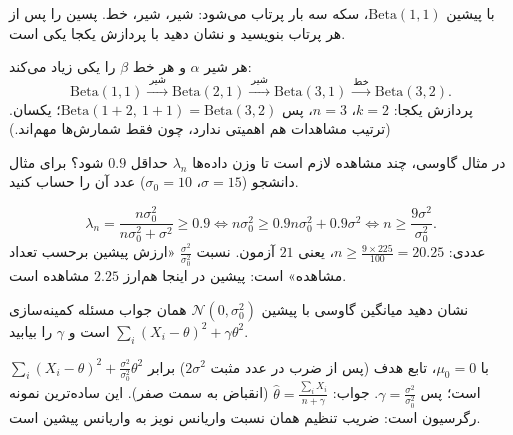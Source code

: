 \begin{exercise}
با پیشین $\mathrm{Beta}(1,1)$، سکه سه بار پرتاب می‌شود: شیر، شیر، خط. پسین را پس از هر پرتاب بنویسید و نشان دهید با پردازش یکجا یکی است.
\end{exercise}
\begin{solution}
هر شیر $\alpha$ و هر خط $\beta$ را یکی زیاد می‌کند:
\[
\mathrm{Beta}(1,1)\xrightarrow{\ \text{شیر}\ }\mathrm{Beta}(2,1)\xrightarrow{\ \text{شیر}\ }\mathrm{Beta}(3,1)\xrightarrow{\ \text{خط}\ }\mathrm{Beta}(3,2).
\]
پردازش یکجا: $k=2$، $n=3$، پس $\mathrm{Beta}(1+2,\ 1+1)=\mathrm{Beta}(3,2)$؛ یکسان. (ترتیب مشاهدات هم اهمیتی ندارد، چون فقط شمارش‌ها مهم‌اند.)
\end{solution}

\begin{exercise}
در مثال گاوسی، چند مشاهده لازم است تا وزن داده‌ها $\lambda_n$ حداقل $0.9$ شود؟ برای مثال دانشجو ($\sigma=15$، $\sigma_0=10$) عدد آن را حساب کنید.
\end{exercise}
\begin{solution}
\[
\lambda_n=\frac{n\sigma_0^2}{n\sigma_0^2+\sigma^2}\ge0.9\iff n\sigma_0^2\ge0.9n\sigma_0^2+0.9\sigma^2\iff n\ge\frac{9\sigma^2}{\sigma_0^2}.
\]
عددی: $n\ge\frac{9\times225}{100}=20.25$، یعنی $21$ آزمون. نسبت $\frac{\sigma^2}{\sigma_0^2}$ «ارزش پیشین برحسب تعداد مشاهده» است: پیشین در اینجا هم‌ارز $2.25$ مشاهده است.
\end{solution}

\begin{exercise}
نشان دهید  میانگین گاوسی با پیشین $\mathcal N(0,\sigma_0^2)$ همان جواب مسئله کمینه‌سازی $\sum_i(X_i-\theta)^2+\gamma\theta^2$ است و $\gamma$ را بیابید.
\end{exercise}
\begin{solution}
با $\mu_0=0$، تابع هدف  (پس از ضرب در عدد مثبت $2\sigma^2$) برابر $\sum_i(X_i-\theta)^2+\frac{\sigma^2}{\sigma_0^2}\theta^2$ است؛ پس $\gamma=\frac{\sigma^2}{\sigma_0^2}$. جواب: $\hat\theta=\frac{\sum_iX_i}{n+\gamma}$ (انقباض به سمت صفر). این ساده‌ترین نمونه رگرسیون  است: ضریب تنظیم همان نسبت واریانس نویز به واریانس پیشین است.
\end{solution}

